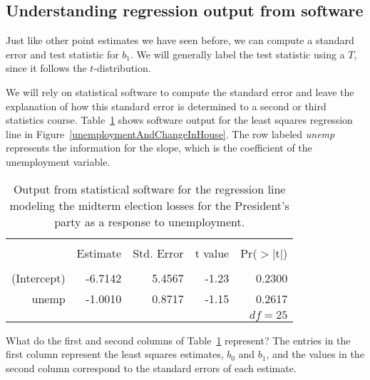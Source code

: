 \textC{\newpage}


\subsection{Understanding regression output from software}
\label{testStatisticForTheSlope}

Just like other point estimates we have seen before, we can compute a standard error and test statistic for $b_1$. We will generally label the test statistic using a $T$, since it follows the $t$-distribution.

We will rely on statistical software to compute the standard error and leave the explanation of how this standard error is determined to a second or third statistics course. Table~\ref{midtermElectionUnemploymentRRegressionOutput} shows software output for the least squares regression line in Figure~\ref{unemploymentAndChangeInHouse}. The row labeled \emph{unemp} represents the information for the slope, which is the coefficient of the unemployment variable.

\begin{table}[ht]
\centering
\begin{tabular}{rrrrr}
  \hline
  \vspace{-3.7mm} & & & & \\
 & Estimate & Std. Error & t value & Pr($>$$|$t$|$) \\ 
  \hline
  \vspace{-3.6mm} & & & & \\
(Intercept) & -6.7142 & 5.4567 & -1.23 & 0.2300 \\ 
  unemp & -1.0010 & 0.8717 & -1.15 & 0.2617 \\ 
   \hline
   \multicolumn{5}{r}{$df=25$} \\
\end{tabular}
\caption{Output from statistical software for the regression line modeling the midterm election losses for the President's party as a response to unemployment.}
\label{midtermElectionUnemploymentRRegressionOutput}
\end{table}

\begin{example}{What do the first and second columns of Table~\ref{midtermElectionUnemploymentRRegressionOutput} represent?}
The entries in the first column represent the least squares estimates, $b_0$ and $b_1$, and the values in the second column correspond to the standard errors of each estimate.
\end{example}

